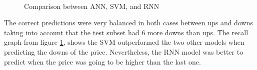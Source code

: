 \begin{figure}
\center
{} 
 \\
\caption{Comparison between ANN, SVM, and RNN}
\label{fig:comparison}
\end{figure}

The correct predictions were very balanced in both cases between ups and downs taking into account that the test subset had 6 more downs than ups. The recall graph from figure \ref{fig:comparison}, shows the SVM outperformed the two other models when predicting the downs of the price. Nevertheless, the RNN model was better to predict when the price was going to be higher than the last one.


